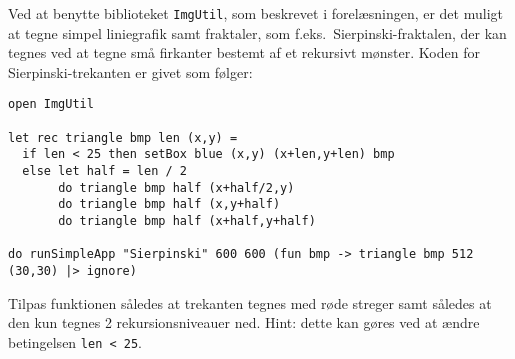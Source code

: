 \label{sierpinski.ov} Ved at benytte biblioteket \texttt{ImgUtil}, som beskrevet i
  forelæsningen, er det muligt at tegne simpel liniegrafik samt
  fraktaler, som f.eks.\ Sierpinski-fraktalen, der kan tegnes ved at
  tegne små firkanter bestemt af et rekursivt mønster. Koden for
  Sierpinski-trekanten er givet som følger:
\begin{lstlisting}[numbers=none,frame=none,mathescape]
open ImgUtil

let rec triangle bmp len (x,y) =
  if len < 25 then setBox blue (x,y) (x+len,y+len) bmp
  else let half = len / 2
       do triangle bmp half (x+half/2,y)
       do triangle bmp half (x,y+half)
       do triangle bmp half (x+half,y+half)

do runSimpleApp "Sierpinski" 600 600 (fun bmp -> triangle bmp 512 (30,30) |> ignore)
\end{lstlisting}

Tilpas funktionen således at trekanten tegnes med røde streger samt
således at den kun tegnes 2 rekursionsniveauer ned. Hint: dette kan
gøres ved at ændre betingelsen \lstinline{len < 25}.
